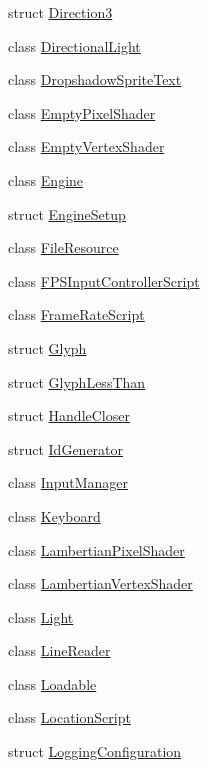 \begin{DoxyCompactItemize}
\item 
struct \hyperlink{structmage_1_1_direction3}{Direction3}
\item 
class \hyperlink{classmage_1_1_directional_light}{Directional\+Light}
\item 
class \hyperlink{classmage_1_1_dropshadow_sprite_text}{Dropshadow\+Sprite\+Text}
\item 
class \hyperlink{classmage_1_1_empty_pixel_shader}{Empty\+Pixel\+Shader}
\item 
class \hyperlink{classmage_1_1_empty_vertex_shader}{Empty\+Vertex\+Shader}
\item 
class \hyperlink{classmage_1_1_engine}{Engine}
\item 
struct \hyperlink{structmage_1_1_engine_setup}{Engine\+Setup}
\item 
class \hyperlink{classmage_1_1_file_resource}{File\+Resource}
\item 
class \hyperlink{classmage_1_1_f_p_s_input_controller_script}{F\+P\+S\+Input\+Controller\+Script}
\item 
class \hyperlink{classmage_1_1_frame_rate_script}{Frame\+Rate\+Script}
\item 
struct \hyperlink{structmage_1_1_glyph}{Glyph}
\item 
struct \hyperlink{structmage_1_1_glyph_less_than}{Glyph\+Less\+Than}
\item 
struct \hyperlink{structmage_1_1_handle_closer}{Handle\+Closer}
\item 
struct \hyperlink{structmage_1_1_id_generator}{Id\+Generator}
\item 
class \hyperlink{classmage_1_1_input_manager}{Input\+Manager}
\item 
class \hyperlink{classmage_1_1_keyboard}{Keyboard}
\item 
class \hyperlink{classmage_1_1_lambertian_pixel_shader}{Lambertian\+Pixel\+Shader}
\item 
class \hyperlink{classmage_1_1_lambertian_vertex_shader}{Lambertian\+Vertex\+Shader}
\item 
class \hyperlink{classmage_1_1_light}{Light}
\item 
class \hyperlink{classmage_1_1_line_reader}{Line\+Reader}
\item 
class \hyperlink{classmage_1_1_loadable}{Loadable}
\item 
class \hyperlink{classmage_1_1_location_script}{Location\+Script}
\item 
struct \hyperlink{structmage_1_1_logging_configuration}{Logging\+Configuration}

\end{DoxyCompactItemize}
